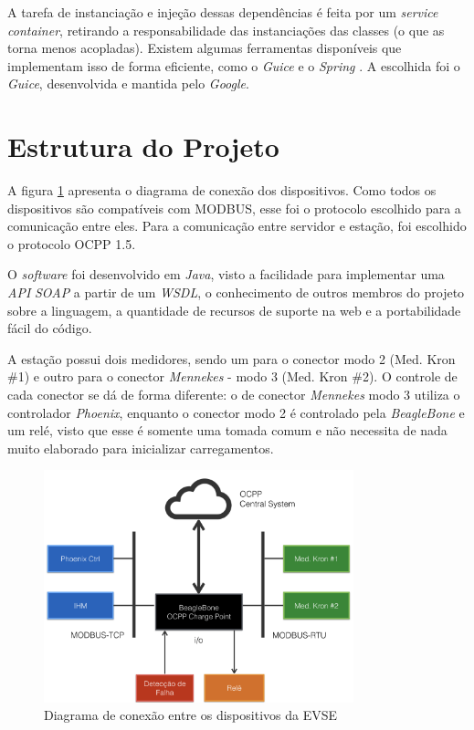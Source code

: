       A tarefa de instanciação e injeção dessas dependências é feita por um \textit{service container}, retirando a responsabilidade das instanciações das classes (o que as torna menos acopladas). Existem algumas ferramentas disponíveis que implementam isso de forma eficiente, como o \textit{Guice} e o \textit{Spring} \cite{developer-guice}. A escolhida foi o \textit{Guice}, desenvolvida e mantida pelo \textit{Google}.

  \section{Estrutura do Projeto}
  \label{methodology:structure}

    A figura \ref{fig:proj-diagram} apresenta o diagrama de conexão dos dispositivos. Como todos os dispositivos são compatíveis com MODBUS, esse foi o protocolo escolhido para a comunicação entre eles. Para a comunicação entre servidor e estação, foi escolhido o protocolo \ac{OCPP} 1.5. 

    O \textit{software} foi desenvolvido em \textit{Java}, visto a facilidade para implementar uma \textit{API} \textit{\ac{SOAP}} a partir de um \textit{\ac{WSDL}}, o conhecimento de outros membros do projeto sobre a linguagem, a quantidade de recursos de suporte na web e a portabilidade fácil do código.

    A estação possui dois medidores, sendo um para o conector modo 2 (Med. Kron \#1) e outro para o conector \textit{Mennekes} - modo 3 (Med. Kron \#2). O controle de cada conector se dá de forma diferente: o de conector \textit{Mennekes} modo 3 utiliza o controlador \textit{Phoenix}, enquanto o conector modo 2 é controlado pela \textit{BeagleBone} e um relé, visto que esse é somente uma tomada comum e não necessita de nada muito elaborado para inicializar carregamentos.

    \begin{figure}[H]
      \begin{center}
        \includegraphics[width=0.8\textwidth,natwidth=400,natheight=288]{assets/images/devices-diagram.png}
        \caption{Diagrama de conexão entre os dispositivos da EVSE}
        \label{fig:proj-diagram}
      \end{center}
    \end{figure}

